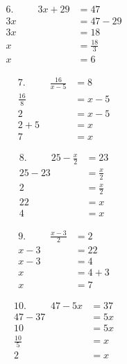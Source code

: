 \begin{minipage}[t]{0.5\textwidth}
	\begin{align*}
		6.\hspace{30pt}3x+29&=47\\
		3x&=47-29\\
		3x&=18\\
		x&=\frac{18}{3}\\
		x&=6
	\end{align*}
\end{minipage}
\vspace{10 mm}
\begin{minipage}[t]{0.5\textwidth}
	\begin{align*}
		7.\hspace{30pt}\frac{16}{x-5}&=8\\
		\frac{16}{8}&=x-5\\
		2&=x-5\\
		2+5&=x\\
		7&=x
	\end{align*}
\end{minipage}
\begin{minipage}[t]{0.5\textwidth}
	\begin{align*}
		8.\hspace{30pt}25-\frac{x}{2}&=23\\
		25-23&=\frac{x}{2}\\
		2&=\frac{x}{2}\\
		22&=x\\
		4&=x
	\end{align*}
\end{minipage}
\vspace{10 mm}
\begin{minipage}[t]{0.5\textwidth}
	\begin{align*}
		9.\hspace{30pt}\frac{x-3}{2}&=2\\
		x-3&=22\\
		x-3&=4\\
		x&=4+3\\
		x&=7
	\end{align*}
\end{minipage}
\begin{minipage}[t]{0.5\textwidth}
	\begin{align*}
		10.\hspace{30pt}47-5x&=37\\
		47-37&=5x\\
		10&=5x\\
		\frac{10}{5}&=x\\
		2&=x
	\end{align*}
\end{minipage}

